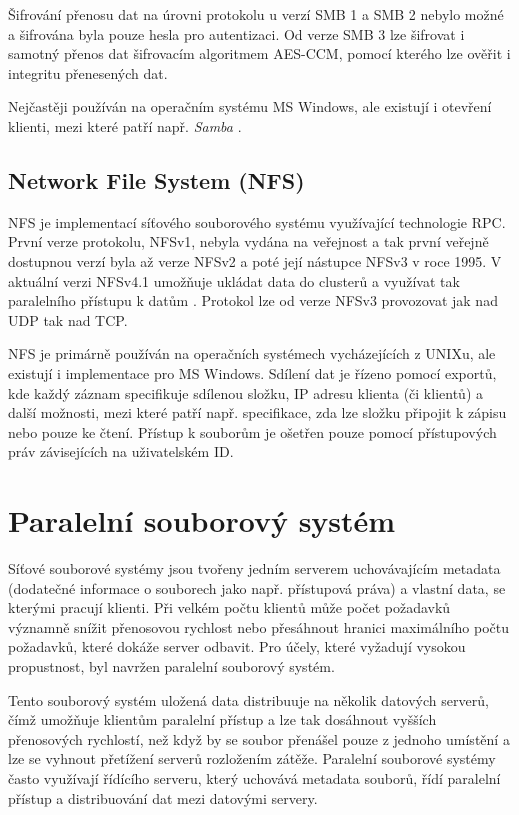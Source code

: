 \documentclass[czech,DP]{thesiskiv}
\begin{document}
Šifrování přenosu dat na úrovni protokolu u verzí SMB 1 a SMB 2 nebylo možné a šifrována byla pouze hesla pro autentizaci. Od verze SMB 3 lze šifrovat i samotný přenos dat šifrovacím algoritmem AES-CCM\cite{aesccmpaper}, pomocí kterého lze ověřit i integritu přenesených dat. 

Nejčastěji používán na operačním systému MS Windows, ale existují i otevření klienti, mezi které patří např. \textit{Samba} \cite{sambaonline}.

\subsection{Network File System (NFS)}

NFS \cite{nfspaper} je implementací síťového souborového systému využívající technologie RPC. První verze protokolu, NFSv1, nebyla vydána na veřejnost a tak první veřejně dostupnou verzí byla až verze NFSv2 a poté její nástupce NFSv3 v roce 1995. V aktuální verzi NFSv4.1 umožňuje ukládat data do clusterů a využívat tak paralelního přístupu k datům \cite{nfsv4}. Protokol lze od verze NFSv3 provozovat jak nad UDP tak nad TCP.

NFS je primárně používán na operačních systémech vycházejících z UNIXu, ale existují i implementace pro MS Windows. Sdílení dat je řízeno pomocí exportů, kde každý záznam specifikuje sdílenou složku, IP adresu klienta (či klientů) a další možnosti, mezi které patří např. specifikace, zda lze složku připojit k zápisu nebo pouze ke čtení. Přístup k souborům je ošetřen pouze pomocí přístupových práv závisejících na uživatelském ID.

\section{Paralelní souborový systém} \label{pnfs}

Síťové souborové systémy jsou tvořeny jedním serverem uchovávajícím metadata (dodatečné informace o souborech jako např. přístupová práva) a vlastní data, se kterými pracují klienti. Při velkém počtu klientů může počet požadavků významně snížit přenosovou rychlost nebo přesáhnout hranici maximálního počtu požadavků, které dokáže server odbavit. Pro účely, které vyžadují vysokou propustnost, byl navržen paralelní souborový systém.

Tento souborový systém uložená data distribuuje na několik datových serverů, čímž umožňuje klientům paralelní přístup a lze tak dosáhnout vyšších přenosových rychlostí, než když by se soubor přenášel pouze z jednoho umístění a lze se vyhnout přetížení serverů rozložením zátěže. Paralelní souborové systémy často využívají řídícího serveru, který uchovává metadata souborů, řídí paralelní přístup a distribuování dat mezi datovými servery.
\end{document}
